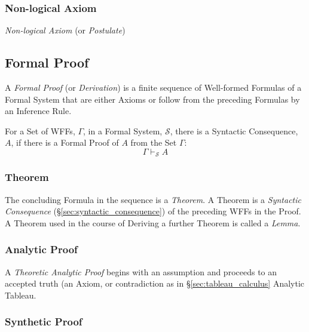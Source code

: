 \subsubsection{Non-logical Axiom}\label{sec:nonlogical_axiom}

\emph{Non-logical Axiom} (or \emph{Postulate})



\subsection{Formal Proof} \label{sec:formal_proof}

A \emph{Formal Proof} (or \emph{Derivation}) is a finite sequence of
Well-formed Formulas of a Formal System that are either Axioms or
follow from the preceding Formulas by an Inference Rule.

For a Set of WFFs, $\Gamma$, in a Formal System, $\mathcal{S}$, there
is a Syntactic Consequence, $A$, if there is a Formal Proof of $A$
from the Set $\Gamma$:
\[
    \Gamma \vdash_{\mathcal{S}} A
\]



\subsubsection{Theorem} \label{sec:theorem}

The concluding Formula in the sequence is a \emph{Theorem}. A Theorem
is a \emph{Syntactic Consequence} (\S\ref{sec:syntactic_consequence})
of the preceding WFFs in the Proof. A Theorem used in the course of
Deriving a further Theorem is called a \emph{Lemma}.



\subsubsection{Analytic Proof} \label{sec:analytic_proof}

A \emph{Theoretic Analytic Proof} begins with an assumption and
proceeds to an accepted truth (an Axiom, or contradiction as in
\S\ref{sec:tableau_calculus} Analytic Tableau.



\subsubsection{Synthetic Proof} \label{sec:synthetic_proof}

